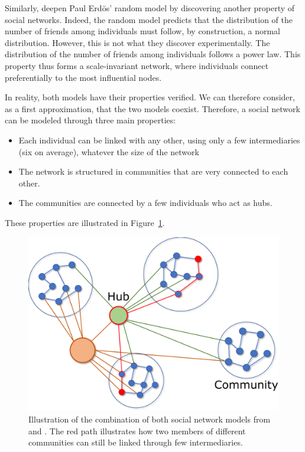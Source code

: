 Similarly, \textcite{barabasiEmergenceScalingRandom1999} deepen Paul Erdös' random model by discovering another property of social networks.
Indeed, the random model predicts that the distribution of the number of friends among individuals must follow, by construction, a normal distribution.
However, this is not what they discover experimentally.
The distribution of the number of friends among individuals follows a power law.
This property thus forms a scale-invariant network, where individuals connect preferentially to the most influential nodes.

In reality, both models have their properties verified.
We can therefore consider, as a first approximation, that the two models coexist.
Therefore, a social network can be modeled through three main properties:

\begin{itemize}
    \item Each individual can be linked with any other, using only a few intermediaries (six on average), whatever the size of the network
    \item The network is structured in communities that are very connected to each other.
    \item The communities are connected by a few individuals who act as hubs.
\end{itemize}

These properties are illustrated in Figure~\ref{context:social-network}.

\begin{figure}[htb]
    \centering
    \includegraphics[width=\textwidth]{figures/chap-1/network.pdf}
    \caption{Illustration of the combination of both social network models from \textcite{wattsCollectiveDynamicsSmallworld1998} and \textcite{barabasiEmergenceScalingRandom1999}. The red path illustrates how two members of different communities can still be linked through few intermediaries.}
    \label{context:social-network}
\end{figure}

